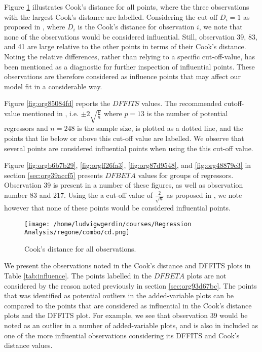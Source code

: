 \documentclass[11pt]{article}
\begin{document}


Figure \ref{fig:org9f287cd} illustrates Cook's distance for all points, where the three observations with the largest 
Cook's distance are labelled. Considering the cut-off \(D_i = 1\) as proposed in \cite{Montgomery2012}, 
where \(D_i\) is the Cook's distance for observation \(i\), we note that none of the observations would be 
considered influential. Still, observation 39, 83, and 41 are large relative
to the other points in terms of their Cook's distance. Noting the relative differences, rather 
than relying to a specific cut-off-value, has been mentioned as a diagnostic for further
inspection of influential points. \cite{Fox1991} These observations are therefore considered as influence
points that may affect our model fit in a considerable way.

Figure \ref{fig:org85084fd} reports the \(DFFITS\) values. 
The recommended cutoff-value mentioned in \cite{Montgomery2012}, i.e. \(\pm 2\sqrt{\frac{p}{n}}\)
where \(p = 13\) is the number of potential regressors and \(n = 248\) is the sample size, is 
plotted as a dotted line, and the points that lie below or above this cut-off value are labelled.
We observe that several points are considered influential points when using the this cut-off value.

Figure \ref{fig:orgb6b7b29}, \ref{fig:orgff26fa3}, \ref{fig:org87d9548}, and
\ref{fig:org48879c3} in section \ref{sec:org39accf5} presents \(DFBETA\) values for groups of regressors. 
Observation 39 is present in a number of these figures, as well as observation number 83 and 217. 
Using the a cut-off value of \(\frac{2}{\sqrt{n}}\) as proposed in \cite{Montgomery2012}, we note however that 
none of these points would be considered influential points.

\begin{figure}[H]
\centering
\texttt{[image: /home/ludvigwgerdin/courses/Regression Analysis/regone/combo/cd.png]}
\caption{\label{fig:org9f287cd}
Cook's distance for all observations.}
\end{figure}

We present the observations noted in the Cook's distance and DFFITS plots in Table \ref{tab:influence}.
The points labelled in the \(DFBETA\) plots are not considered by the reason noted previously 
in section \ref{sec:org93d67bc}. The points that was identified as potential outliers in the added-variable
plots can be compared to the points that are considered as influential in the Cook's distance plots
and the DFFITS plot. For example, we see that observation 39 would be noted as an outlier in a number of 
added-variable plots, and is also in included as one of the more influential observations considering 
its DFFITS and Cook's distance values.
\end{document}
